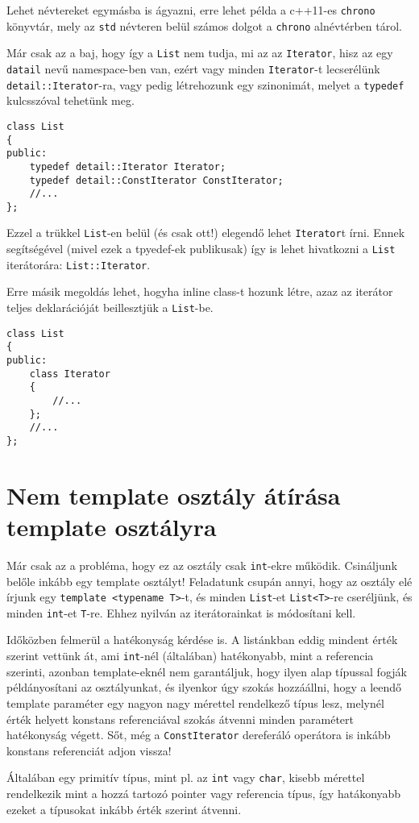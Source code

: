 \documentclass[a4paper,11.5pt]{article}
\begin{document}
	Lehet névtereket egymásba is ágyazni, erre lehet példa a c++11-es \texttt{chrono} könyvtár, mely az \texttt{std} névteren belül számos dolgot a \texttt{chrono} alnévtérben tárol.
	
	\medskip
	Már csak az a baj, hogy így a \texttt{List} nem tudja, mi az az \texttt{Iterator}, hisz az egy \texttt{datail} nevű namespace-ben van, ezért vagy minden \texttt{Iterator}-t lecserélünk \texttt{detail::Iterator}-ra, vagy pedig létrehozunk egy szinonimát, melyet a \texttt{typedef} kulcsszóval tehetünk meg.
\begin{lstlisting}
class List
{
public:
	typedef detail::Iterator Iterator;
	typedef detail::ConstIterator ConstIterator;
	//...
};
\end{lstlisting}
	Ezzel a trükkel \texttt{List}-en belül (és csak ott!) elegendő lehet \texttt{Iterator}t írni. Ennek segítségével (mivel ezek a tpyedef-ek publikusak) így is lehet hivatkozni a \texttt{List} iterátorára: \texttt{List::Iterator}.
	
	\medskip
	Erre másik megoldás lehet, hogyha inline class-t hozunk létre, azaz az iterátor teljes deklarációját beillesztjük a \texttt{List}-be.
\begin{lstlisting}
class List
{
public:
	class Iterator
	{
		//...
	};
	//...
};
\end{lstlisting}
	\section{Nem template osztály átírása template osztályra}
	Már csak az a probléma, hogy ez az osztály csak \texttt{int}-ekre működik. Csináljunk belőle inkább egy template osztályt! Feladatunk csupán annyi, hogy az osztály elé írjunk egy \texttt{template <typename T>}-t, és minden \texttt{List}-et \texttt{List<T>}-re cseréljünk, és minden \texttt{int}-et \texttt{T}-re. Ehhez nyilván az iterátorainkat is módosítani kell.
	
	\medskip
	Időközben felmerül a hatékonyság kérdése is. A listánkban eddig mindent érték szerint vettünk át, ami \texttt{int}-nél (általában) hatékonyabb, mint a referencia szerinti, azonban template-eknél nem garantáljuk, hogy ilyen alap típussal fogják példányosítani az osztályunkat, és ilyenkor úgy szokás hozzáállni, hogy a leendő template paraméter egy nagyon nagy mérettel rendelkező típus lesz, melynél érték helyett konstans referenciával szokás átvenni minden paramétert hatékonyság végett. Sőt, még a \texttt{ConstIterator} dereferáló operátora is inkább konstans referenciát adjon vissza!
	\begin{note}
		Általában egy primitív típus, mint pl. az \texttt{int} vagy \texttt{char}, kisebb mérettel rendelkezik mint a hozzá tartozó pointer vagy referencia típus, így hatákonyabb ezeket a típusokat inkább érték szerint átvenni.
	\end{note}
	
\end{document}
